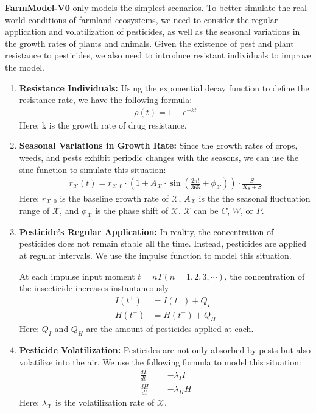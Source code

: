 \documentclass[12pt]{article}  %
\begin{document}
\textbf{FarmModel-V0} only models the simplest scenarios. To better simulate the 
real-world conditions of farmland ecosystems, we need to consider the regular 
application and volatilization of pesticides, as well as the seasonal 
variations in the growth rates of plants and animals. Given the existence 
of pest and plant resistance to pesticides, we also need to introduce 
resistant individuals to improve the model.
\begin{enumerate}
    \item \textbf{Resistance Individuals:} Using the exponential decay function to define 
    the resistance rate, we have the following formula:
        \begin{align}
            \rho(t) = 1 - e^{-k t} \label{eq:resistance1.0}
        \end{align}
        Here: k is the growth rate of drug resistance.
    \item \textbf{Seasonal Variations in Growth Rate:} Since the growth rates 
    of crops, weeds, and pests exhibit periodic changes with the seasons, 
    we can use the sine function to simulate this situation:
        \begin{align}
            r_{\mathcal X}(t) = r_{\mathcal{X},0} \cdot \left(1 + A_{\mathcal X} \cdot \sin\left(\frac{2\pi t}{365} + \phi_{\mathcal X}\right)\right)\cdot \frac{S}{K_S + S} \label{eq:seasonal1.0}
        \end{align}
        Here: $r_{\mathcal X,0}$ is the baseline growth rate of $\mathcal{X}$, $A_{\mathcal{X}}$ is the 
        the seasonal fluctuation range of $\mathcal X$, and $\phi_{\mathcal X}$ is the phase shift of $\mathcal X$. $\mathcal X$ can be 
        $C$, $W$, or $P$.
    \item \textbf{Pesticide's Regular Application:} In reality, the 
    concentration of pesticides does not remain stable all the time. 
    Instead, pesticides are applied at regular intervals. We use the 
    impulse function to model this situation.

    At each impulse input moment $t=nT(n=1,2,3,\cdots)$, the concentration of 
    the insecticide increases instantaneously
    \begin{align}
        I(t^+) &= I(t^-) + Q_I \label{eq:I-R-A}\\
        H(t^+) &= H(t^-) + Q_H \label{eq:H-R-A}
    \end{align}
    Here: $Q_I$ and $Q_H$ are the amount of pesticides applied at each.
    \item \textbf{Pesticide Volatilization:} Pesticides are not only absorbed
    by pests but also volatilize into the air. We use the following formula
    to model this situation:
        \begin{align}
            \frac{dI}{dt} &= -\lambda_I I \label{eq:volatilization2}\\
            \frac{dH}{dt} &= -\lambda_H H \label{eq:volatilization1}
        \end{align}
        Here: $\lambda_{\mathcal X}$ is the volatilization rate of $\mathcal X$.
    \end{enumerate}
\end{document}
